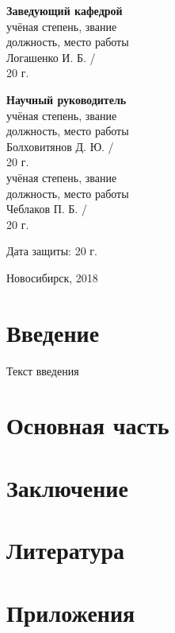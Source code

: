 \documentclass[14pt,russian,a4paper]{extarticle}
\begin{document}
{\noindent
\begin{minipage}[t]{70mm}
    \begin{center}
    {\bf Заведующий кафедрой} \\
    учёная степень, звание \\
    должность, место работы \\
    Логашенко И. Б. / \makebox[20mm]{\dotfill} \\
    \guillemotleft\makebox[10mm]{\dotfill}\guillemotright \makebox[30mm]{\dotfill} 20\makebox[5mm]{\dotfill} г.
    \end{center}
\end{minipage}
\hfill
\begin{minipage}[t]{70mm}
    \begin{center}
    {\bf Научный руководитель} \\
    учёная степень, звание \\
    должность, место работы \\
    Болховитянов Д. Ю. / \makebox[20mm]{\dotfill} \\
    \guillemotleft\makebox[10mm]{\dotfill}\guillemotright \makebox[30mm]{\dotfill} 20\makebox[5mm]{\dotfill} г. \\
    учёная степень, звание \\
    должность, место работы \\
    Чеблаков П. Б. / \makebox[20mm]{\dotfill} \\
    \guillemotleft\makebox[10mm]{\dotfill}\guillemotright \makebox[30mm]{\dotfill} 20\makebox[5mm]{\dotfill} г.
    \end{center}
\end{minipage}

\vspace{4mm}

\begin{flushright}
    Дата защиты: \guillemotleft\makebox[10mm]{\dotfill}\guillemotright \makebox[30mm]{\dotfill} 20\makebox[5mm]{\dotfill} г.
\end{flushright}

\vfill

\centerline{Новосибирск, 2018}
}

\newpage
\thispagestyle{empty}
\tableofcontents
\newpage

\section{Введение}
Текст введения
\section{Основная часть}
\section{Заключение}
\section{Литература}
\section{Приложения}
\end{document}

